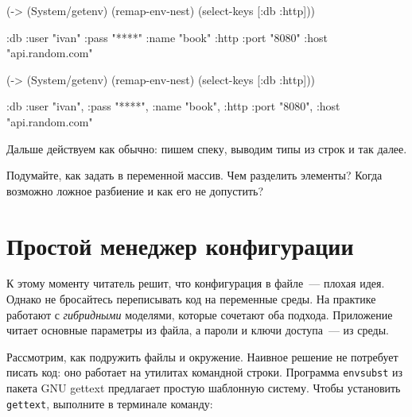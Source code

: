 \begin{english}
  \begin{clojure}
(-> (System/getenv)
    (remap-env-nest)
    (select-keys [:db :http]))

{:db {:user "ivan"
      :pass "****"
      :name "book"}
 :http {:port "8080"
        :host "api.random.com"}}
  \end{clojure}
\end{english}

\else

\begin{english}
  \begin{clojure}
(-> (System/getenv)
    (remap-env-nest)
    (select-keys [:db :http]))

{:db {:user "ivan", :pass "****", :name "book"},
 :http {:port "8080", :host "api.random.com"}}
  \end{clojure}
\end{english}

\fi

\noindent
Дальше действуем как обычно: пишем спеку, выводим типы из строк и так далее.

Подумайте, как задать в переменной массив. Чем разделить элементы? Когда
возможно ложное разбиение и как его не допустить?

\section{Простой менеджер конфигурации}


К этому моменту читатель решит, что конфигурация в файле~--- плохая идея. Однако
не бросайтесь переписывать код на переменные среды. На практике работают с
\emph{гибридными} моделями, которые сочетают оба подхода. Приложение читает
основные параметры из файла, а пароли и ключи доступа~--- из среды.


Рассмотрим, как подружить файлы и окружение. Наивное решение не потребует писать
код: оно работает на утилитах командной строки. Программа \verb|envsubst| из
пакета GNU gettext предлагает простую шаблонную систему. Чтобы установить
\verb|gettext|, выполните в терминале команду:


\begin{english}
\end{english}

